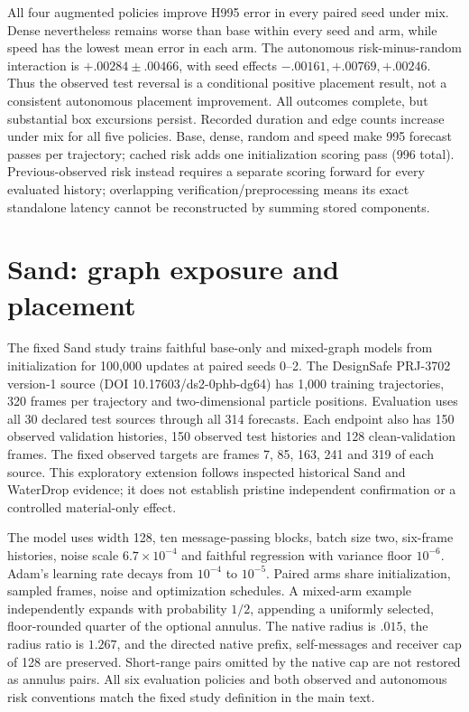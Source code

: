All four augmented policies improve H995 error in every paired seed under mix. Dense nevertheless remains worse than base within every seed and arm, while speed has the lowest mean error in each arm. The autonomous risk-minus-random interaction is $+.00284\pm.00466$, with seed effects $-.00161,+.00769,+.00246$. Thus the observed test reversal is a conditional positive placement result, not a consistent autonomous placement improvement. All outcomes complete, but substantial box excursions persist. Recorded duration and edge counts increase under mix for all five policies. Base, dense, random and speed make 995 forecast passes per trajectory; cached risk adds one initialization scoring pass (996 total). Previous-observed risk instead requires a separate scoring forward for every evaluated history; overlapping verification/preprocessing means its exact standalone latency cannot be reconstructed by summing stored components.

\section{Sand: graph exposure and placement}
\label{sec:sand-graph-exposure}
The fixed Sand study trains faithful base-only and mixed-graph models from initialization for 100,000 updates at paired seeds 0--2. The DesignSafe PRJ-3702 version-1 source (DOI 10.17603/ds2-0phb-dg64) has 1,000 training trajectories, 320 frames per trajectory and two-dimensional particle positions. Evaluation uses all 30 declared test sources through all 314 forecasts. Each endpoint also has 150 observed validation histories, 150 observed test histories and 128 clean-validation frames. The fixed observed targets are frames 7, 85, 163, 241 and 319 of each source. This exploratory extension follows inspected historical Sand and WaterDrop evidence; it does not establish pristine independent confirmation or a controlled material-only effect.

The model uses width 128, ten message-passing blocks, batch size two, six-frame histories, noise scale $6.7\times10^{-4}$ and faithful regression with variance floor $10^{-6}$. Adam's learning rate decays from $10^{-4}$ to $10^{-5}$. Paired arms share initialization, sampled frames, noise and optimization schedules. A mixed-arm example independently expands with probability $1/2$, appending a uniformly selected, floor-rounded quarter of the optional annulus. The native radius is $.015$, the radius ratio is $1.267$, and the directed native prefix, self-messages and receiver cap of 128 are preserved. Short-range pairs omitted by the native cap are not restored as annulus pairs. All six evaluation policies and both observed and autonomous risk conventions match the fixed study definition in the main text.

